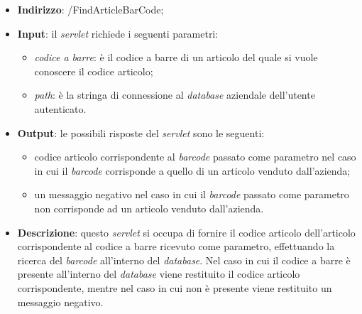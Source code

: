 \begin{itemize}
	\item \textbf{Indirizzo}: /FindArticleBarCode;
	\item \textbf{Input}: il \textit{servlet} richiede i seguenti parametri:
		\begin{itemize}
			\item \textit{codice a barre}: è il codice a barre di un articolo del quale si vuole conoscere il codice articolo;
			\item \textit{path}: è la stringa di connessione al \textit{database} aziendale dell'utente autenticato.
		\end{itemize}
	\item \textbf{Output}: le possibili risposte del \textit{servlet} sono le seguenti:
		\begin{itemize}
			\item codice articolo corrispondente al \textit{barcode} passato come parametro nel caso in cui il \textit{barcode} corrisponde a quello di un articolo venduto dall'azienda;
			\item un messaggio negativo nel caso in cui il \textit{barcode} passato come parametro non corrisponde ad un articolo venduto dall'azienda.
		\end{itemize}
	\item \textbf{Descrizione}: questo \textit{servlet} si occupa di fornire il codice articolo dell'articolo corrispondente al codice a barre ricevuto come parametro, effettuando la ricerca del \textit{barcode} all'interno del \textit{database}. Nel caso in cui il codice a barre è presente all'interno del \textit{database} viene restituito il codice articolo corrispondente, mentre nel caso in cui non è presente viene restituito un messaggio negativo.
\end{itemize}



